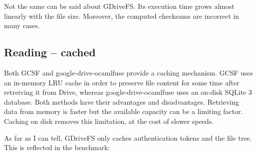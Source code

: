 Not the same can be said about GDriveFS. Its execution time grows almost linearly with the file size. Moreover, the computed checksums are incorrect in many cases.


\subsection{Reading -- cached}

Both GCSF and google-drive-ocamlfuse provide a caching mechanism. GCSF uses an in-memory LRU cache in order to preserve file content for some time after retreiving it from Drive, whereas google-drive-ocamlfuse uses an on-disk SQLite 3 database. Both methods have their advantages and disadvantages. Retrieving data from memory is faster but the available capacity can be a limiting factor. Caching on disk removes this limitation, at the cost of slower speeds.

As far as I can tell, GDriveFS only caches authentication tokens and the file tree. This is reflected in the benchmark:

\cachereaddata


